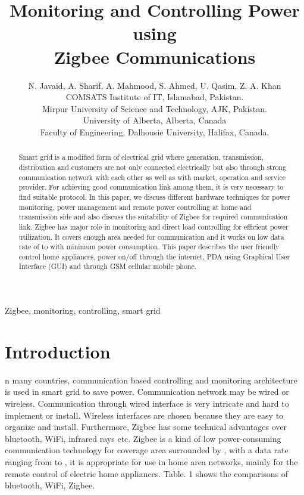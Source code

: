 \documentclass[10pt, conference, compsocconf]{IEEEtran}
\begin{document}
\title{Monitoring and Controlling Power using\\ Zigbee Communications}


\author{N. Javaid, A. Sharif, A. Mahmood, S. Ahmed, U. Qasim, Z. A. Khan\\

        COMSATS Institute of IT, Islamabad, Pakistan. \\
        Mirpur University of Science and Technology, AJK, Pakistan.\\
        University of Alberta, Alberta, Canada\\
        Faculty of Engineering, Dalhousie University, Halifax, Canada.
        }

\maketitle


\begin{abstract}
Smart grid is a modified form of electrical grid where generation, transmission, distribution and customers are not only connected electrically but also through strong communication network with each other as well as with market, operation and service provider. For achieving good communication link among them, it is very necessary to find suitable protocol. In this paper, we discuss different hardware techniques for power monitoring, power management and remote power controlling at home and transmission side and also discuss the suitability of Zigbee for required communication link. Zigbee has major role in monitoring and direct load controlling for efficient power utilization. It covers enough area needed for communication and it works on low data rate of  to  with minimum power consumption. This paper describes the user friendly control home appliances, power on/off through the internet, PDA using Graphical User Interface (GUI) and through GSM cellular mobile phone.

 \end{abstract}

\begin{IEEEkeywords}
Zigbee, monitoring, controlling, smart grid
\end{IEEEkeywords}

\IEEEpeerreviewmaketitle
\section{Introduction}

n many countries, communication based controlling and monitoring architecture is used in smart grid to save power. Communication network may be wired or wireless. Communication through wired interface is very intricate and hard to implement or install. Wireless interfaces are chosen because they are easy to organize and install. Furthermore, Zigbee has some technical advantages over bluetooth, WiFi, infrared rays etc. Zigbee is a kind of low power-consuming communication technology for coverage area surrounded by , with a data rate ranging from  to , it is appropriate for use in home area networks, mainly for the remote control of electric home appliances. Table. 1 shows the comparisons of bluetooth, WiFi, Zigbee.
\end{document}
